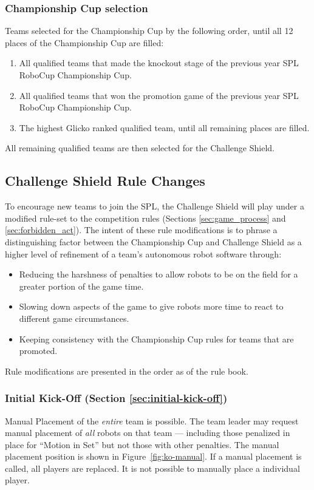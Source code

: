 \subsubsection{Championship Cup selection}

Teams selected for the Championship Cup by the following order, until all 12 places of the Championship Cup are filled:
\begin{enumerate}
    \item All qualified teams that made the knockout stage of the previous year SPL RoboCup Championship Cup.
    \item All qualified teams that won the promotion game  of the previous year SPL RoboCup Championship Cup.
    \item The highest Glicko ranked qualified team, until all remaining places are filled.
\end{enumerate}

All remaining qualified teams are then selected for the Challenge Shield.


\subsection{Challenge Shield Rule Changes}
\label{sec:cs-rule-changes}

To encourage new teams to join the SPL, the Challenge Shield will play under a modified rule-set to the competition rules (Sections \ref{sec:game_process} and \ref{sec:forbidden_act}). The intent of these rule modifications is to phrase a distinguishing factor between the Championship Cup and Challenge Shield as a higher level of refinement of a team's autonomous robot software through:
\begin{itemize}
    \item Reducing the harshness of penalties to allow robots to be on the field for a greater portion of the game time.
    \item Slowing down aspects of the game to give robots more time to react to different game circumstances.
    \item Keeping consistency with the Championship Cup rules for teams that are promoted.
\end{itemize}

Rule modifications are presented in the order as of the rule book.

\subsubsection{Initial Kick-Off (Section \ref{sec:initial-kick-off})}
Manual Placement of the \emph{entire} team is possible. The team leader may request manual placement of \emph{all} robots on that team --- including those penalized in place for ``Motion in Set'' but not those with other penalties. The manual placement position is shown in Figure~\ref{fig:ko-manual}. If a manual placement is called, all players are replaced. It is not possible to manually place a individual player.


